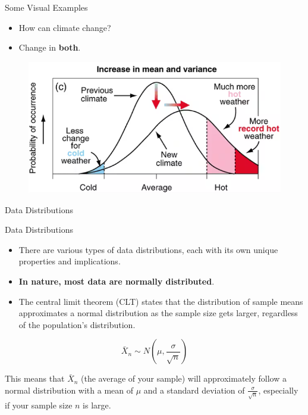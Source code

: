\documentclass[
  ignorenonframetext,
]{beamer}
\providecommand{\tightlist}{%
  \setlength{\itemsep}{0pt}\setlength{\parskip}{0pt}}
\begin{document}
\begin{frame}{Some Visual Examples}
\label{some-visual-examples-2}
\begin{itemize}
\tightlist
\item
  How can climate change?
\end{itemize}

\begin{itemize}
\tightlist
\item
  Change in \textbf{both}.
\end{itemize}

\begin{figure}
\includegraphics[width=0.6\linewidth]{fig/climate3} \end{figure}
\end{frame}

\begin{frame}{Data Distributions}
\label{data-distributions}
\end{frame}

\begin{frame}{Data Distributions}
\label{data-distributions-1}
\begin{itemize}
\item
  There are various types of data distributions, each with its own
  unique properties and implications.
\item
  \textbf{In nature, most data are normally distributed}.
\item
  The central limit theorem (CLT) states that the distribution of sample
  means approximates a normal distribution as the sample size gets
  larger, regardless of the population's distribution.
\end{itemize}

\[
\bar{X}_n \sim N\left(\mu, \frac{\sigma}{\sqrt{n}}\right)
\]

This means that \(\bar{X}_n\) (the average of your sample) will
approximately follow a normal distribution with a mean of \(\mu\) and a
standard deviation of \(\frac{\sigma}{\sqrt{n}}\), especially if your
sample size \(n\) is large.
\end{frame}
\end{document}
